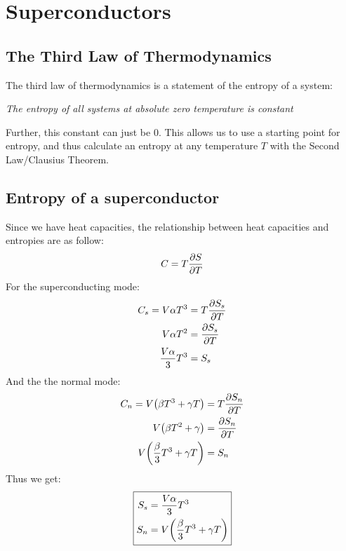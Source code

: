 \documentclass[12pt]{article}
\begin{document}
\section{Superconductors}
\subsection{The Third Law of Thermodynamics}
The third law of thermodynamics is a statement of the entropy of a system:
\begin{center}
  \textit{The entropy of all systems at absolute zero temperature is constant}
\end{center}
Further, this constant can just be $0$. This allows us to use a starting point for entropy, and thus calculate an entropy at any temperature $T$ with the Second Law/Clausius Theorem.
\subsection{Entropy of a superconductor}
Since we have heat capacities, the relationship between heat capacities and entropies are as follow:
\begin{align*}
  C=T\pdv{S}{T}
\end{align*}
For the superconducting mode:
\begin{align*}
  C_s=V\alpha T^3&=T\pdv{S_s}{T}\\
  V\alpha T^2&=\pdv{S_s}{T}\\
  \frac{V\alpha}{3}T^3&=S_s
\end{align*}
And the the normal mode:
\begin{align*}
  C_n=V\qty(\beta T^3+\gamma T)&=T\pdv{S_n}{T}\\
  V\qty(\beta T^2+\gamma)&=\pdv{S_n}{T}\\
  V\qty(\frac\beta3T^3+\gamma T)&=S_n
\end{align*}
Thus we get:
\begin{equation}
  \boxed{
    \begin{aligned}
      S_s&=\frac{V\alpha}{3}T^3\\
      S_n&=V\qty(\frac\beta3T^3+\gamma T)
    \end{aligned}
  }
\end{equation}
\end{document}
